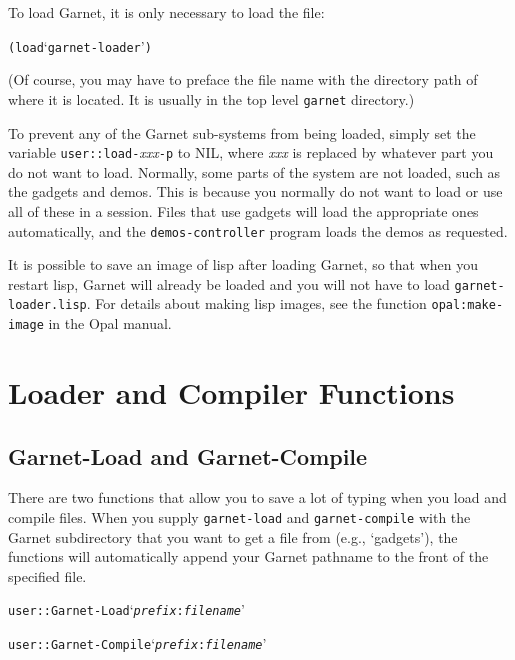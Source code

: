 \documentclass{report}
\newenvironment{programexample}{\begin{alltt}}{\end{alltt}}
\begin{document}
To load Garnet, it is only necessary to load the file:
\begin{programexample}
  (load `garnet-loader')
\end{programexample}

(Of course, you may have to preface the file name with the directory
path of where it is located.  It is usually in the top level
\texttt{garnet} directory.)

To prevent any of the Garnet sub-systems from being loaded, simply set
the variable \texttt{user::load-}{\it xxx}\texttt{-p} to NIL, where {\it xxx}
is replaced by whatever part you do not want to load. Normally, some
parts of the system are not loaded, such as the gadgets and demos.
This is because you normally do not want to load or use all of these
in a session.  Files that use gadgets will load the appropriate ones
automatically, and the \texttt{demos-controller} program loads the demos
as requested.

It is possible to save an image of lisp after loading Garnet, so that
when you restart lisp, Garnet will already be loaded and you will not
have to load \texttt{garnet-loader.lisp}.  For details about making lisp
images, see the function \texttt{opal:make-image} in the Opal manual.

\section{Loader and Compiler Functions}
\label{garnet-load}
  

\subsection{Garnet-Load and Garnet-Compile}

There are two functions that allow you to save a lot of typing when
you load and compile files.  When you supply \texttt{garnet-load} and
\texttt{garnet-compile} with the Garnet subdirectory that you want to get
a file from (e.g., `gadgets'), the functions will automatically append
your Garnet pathname to the front of the specified file.

\begin{programexample}
  user::Garnet-Load `{\it prefix}:{\it filename}'\value{function}
  
  user::Garnet-Compile `{\it prefix}:{\it filename}'\value{function}
\end{programexample}
\end{document}
